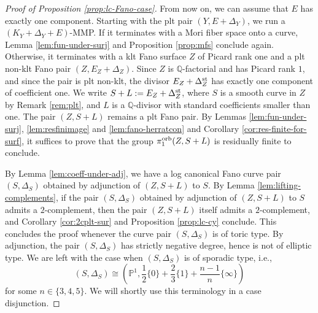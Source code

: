 \documentclass{amsart}
\newcommand{\pp}{\mathbb{P}}
\newcommand{\qq}{\mathbb{Q}}
\theoremstyle{definition}
\theoremstyle{remark}
\numberwithin{equation}{section}
\newcommand{\cecile}[1]{\textcolor{red}{#1}}
\begin{document}
\begin{proof}[Proof of Proposition \ref{prop:lc-Fano-case}]

From now on, we can assume that $E$ has exactly one component.
Starting with the plt pair $(Y,E+\Delta_Y)$, we run a $(K_Y+\Delta_Y+E)$-MMP.
If it terminates with a Mori fiber space onto a curve, Lemma \ref{lem:fun-under-surj} and Proposition \ref{prop:mfs} conclude again. Otherwise, it terminates with a klt Fano surface $Z$ of Picard rank one and a plt non-klt Fano pair $(Z,E_Z+\Delta_Z)$. 
Since $Z$ is $\qq$-factorial and has Picard rank $1$, and since the pair is plt non-klt, the divisor $E_Z+\Delta_Z^{\rm st}$ has exactly one component of coefficient one. We write $S+L := E_Z+\Delta_Z^{\rm st}$, where $S$ is a smooth curve in $Z$ by Remark \ref{rem:plt}, and $L$ is a $\qq$-divisor with standard coefficients smaller than one.
The pair $(Z,S+L)$ remains a plt Fano pair. 
By Lemmas \ref{lem:fun-under-surj}, \ref{lem:resfinimage} and \ref{lem:fano-herratcon} and Corollary \ref{cor:res-finite-for-surf}, it suffices to prove that the group $\pi_1^{\rm orb}(Z,S+L)$ is residually finite to conclude.

\medskip

By Lemma \ref{lem:coeff-under-adj}, we have a log canonical Fano curve pair $(S,\Delta_S)$ obtained by adjunction of $(Z,S+L)$ to $S$. By Lemma \ref{lem:lifting-complements}, if the pair $(S,\Delta_S)$ obtained by adjunction of $(Z,S+L)$ to $S$ admits a $2$-complement, then the pair $(Z,S+L)$ itself admits a $2$-complement, and Corollary \ref{cor:2cplt-sur} and Proposition \ref{prop:lc-cy} conclude. This concludes the proof whenever the curve pair $(S,\Delta_S)$ is of toric type. By adjunction, the pair $(S,\Delta_S)$ has strictly negative degree, hence is not of elliptic type. We are left with the case when $(S,\Delta_S)$ is of sporadic type, i.e., 
$$(S,\Delta_S)\cong \left(\pp^1,\frac{1}{2}\{0\}+\frac{2}{3}\{1\}+\frac{n-1}{n}\{\infty\}\right)$$
for some $n\in\{3,4,5\}$.
We will shortly use this terminology in a case disjunction.


\end{proof}
\end{document}
